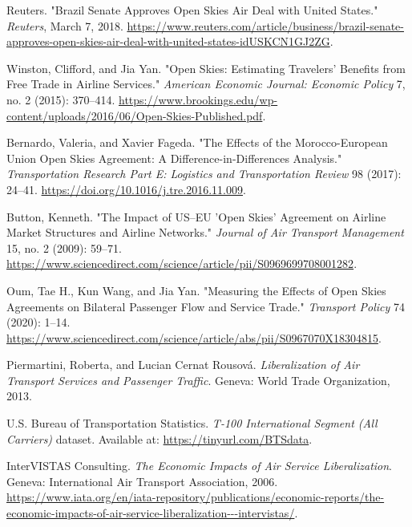 \documentclass[12pt]{article}
\begin{document}
\newpage

\begin{thebibliography}{}

Reuters. "Brazil Senate Approves Open Skies Air Deal with United States." \textit{Reuters}, March 7, 2018. \url{https://www.reuters.com/article/business/brazil-senate-approves-open-skies-air-deal-with-united-states-idUSKCN1GJ2ZG}.

Winston, Clifford, and Jia Yan. "Open Skies: Estimating Travelers’ Benefits from Free Trade in Airline Services." \textit{American Economic Journal: Economic Policy} 7, no. 2 (2015): 370–414. \url{https://www.brookings.edu/wp-content/uploads/2016/06/Open-Skies-Published.pdf}.

Bernardo, Valeria, and Xavier Fageda. "The Effects of the Morocco-European Union Open Skies Agreement: A Difference-in-Differences Analysis." \textit{Transportation Research Part E: Logistics and Transportation Review} 98 (2017): 24–41. \url{https://doi.org/10.1016/j.tre.2016.11.009}.

Button, Kenneth. "The Impact of US–EU 'Open Skies' Agreement on Airline Market Structures and Airline Networks." \textit{Journal of Air Transport Management} 15, no. 2 (2009): 59–71. \url{https://www.sciencedirect.com/science/article/pii/S0969699708001282}.

Oum, Tae H., Kun Wang, and Jia Yan. "Measuring the Effects of Open Skies Agreements on Bilateral Passenger Flow and Service Trade." \textit{Transport Policy} 74 (2020): 1–14. \url{https://www.sciencedirect.com/science/article/abs/pii/S0967070X18304815}.

Piermartini, Roberta, and Lucian Cernat Rousová. \textit{Liberalization of Air Transport Services and Passenger Traffic}. Geneva: World Trade Organization, 2013.

U.S. Bureau of Transportation Statistics. \textit{T-100 International Segment (All Carriers)} dataset. Available at: \url{https://tinyurl.com/BTSdata}.

InterVISTAS Consulting. \textit{The Economic Impacts of Air Service Liberalization}. Geneva: International Air Transport Association, 2006. \\
\url{https://www.iata.org/en/iata-repository/publications/economic-reports/the-economic-impacts-of-air-service-liberalization---intervistas/}.


\end{thebibliography}
\end{document}
